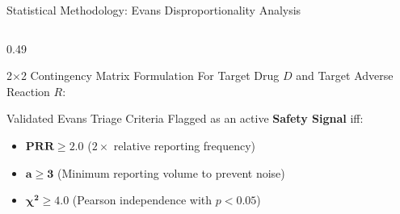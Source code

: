 \documentclass[11pt, aspectratio=169]{beamer}
\begin{document}
\begin{frame}{Statistical Methodology: Evans Disproportionality Analysis}
    \begin{columns}[T]
        \begin{column}{0.49\textwidth}
            \begin{block}{\footnotesize 2$\times$2 Contingency Matrix Formulation}
                \centering\scriptsize
                For Target Drug $D$ and Target Adverse Reaction $R$:
                \vspace{0.03cm}
                \vspace{0.03cm}
            \end{block}

            \begin{exampleblock}{\footnotesize Validated Evans Triage Criteria}
                \scriptsize
                Flagged as an active \textbf{Safety Signal} iff:
                \begin{itemize}\scriptsize
                    \item $\mathbf{\text{PRR} \ge 2.0}$ ($2\times$ relative reporting frequency)
                    \item $\mathbf{a \ge 3}$ (Minimum reporting volume to prevent noise)
                    \item $\mathbf{\chi^2 \ge 4.0}$ (Pearson independence with $p < 0.05$)
                \end{itemize}
            \end{exampleblock}
        \end{column}


\end{columns}
\end{frame}
\end{document}
